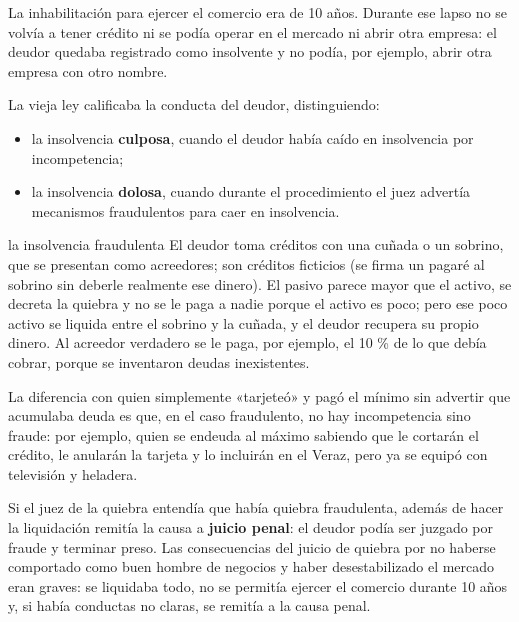 \documentclass[12pt,oneside]{book}
\begin{document}
La inhabilitación para ejercer el comercio era de 10 años. Durante ese lapso no se volvía a tener crédito ni se podía operar en el mercado ni abrir otra empresa: el deudor quedaba registrado como insolvente y no podía, por ejemplo, abrir otra empresa con otro nombre.

La vieja ley calificaba la conducta del deudor, distinguiendo:

\begin{itemize}
    \item la insolvencia \textbf{culposa}, cuando el deudor había caído en insolvencia por incompetencia;
    \item la insolvencia \textbf{dolosa}, cuando durante el procedimiento el juez advertía mecanismos fraudulentos para caer en insolvencia.
\end{itemize}

\begin{example}{la insolvencia fraudulenta}
El deudor toma créditos con una cuñada o un sobrino, que se presentan como acreedores; son créditos ficticios (se firma un pagaré al sobrino sin deberle realmente ese dinero). El pasivo parece mayor que el activo, se decreta la quiebra y no se le paga a nadie porque el activo es poco; pero ese poco activo se liquida entre el sobrino y la cuñada, y el deudor recupera su propio dinero. Al acreedor verdadero se le paga, por ejemplo, el 10 \% de lo que debía cobrar, porque se inventaron deudas inexistentes.
\end{example}

La diferencia con quien simplemente «tarjeteó» y pagó el mínimo sin advertir que acumulaba deuda es que, en el caso fraudulento, no hay incompetencia sino fraude: por ejemplo, quien se endeuda al máximo sabiendo que le cortarán el crédito, le anularán la tarjeta y lo incluirán en el Veraz, pero ya se equipó con televisión y heladera.

Si el juez de la quiebra entendía que había quiebra fraudulenta, además de hacer la liquidación remitía la causa a \textbf{juicio penal}: el deudor podía ser juzgado por fraude y terminar preso. Las consecuencias del juicio de quiebra por no haberse comportado como buen hombre de negocios y haber desestabilizado el mercado eran graves: se liquidaba todo, no se permitía ejercer el comercio durante 10 años y, si había conductas no claras, se remitía a la causa penal.
\end{document}
